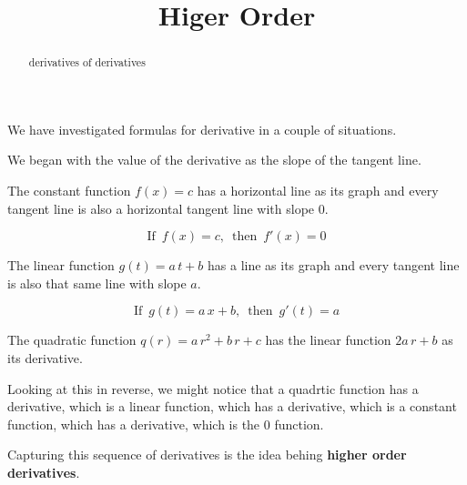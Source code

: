 \documentclass{ximera}
\title{Higer Order}
\begin{document}
\begin{abstract}
  derivatives of derivatives
\end{abstract}
\maketitle





We have investigated formulas for derivative in a couple of situations.


We began with the value of the derivative as the slope of the tangent line.

The constant function $f(x) = c$ has a horizontal line as its graph and every tangent line is also a horizontal tangent line with slope $0$.


\[
\text{If } \, f(x) = c, \, \text{ then } \, f'(x) = 0
\]



The linear function $g(t) = a \, t + b$ has a line as its graph and every tangent line is also that same line with slope $a$.



\[
\text{If } \, g(t) = a \, x + b, \, \text{ then } \, g'(t) = a
\]




The quadratic function $q(r) = a \, r^2 + b \, r + c$ has the linear function $2a \, r + b$ as its derivative.





Looking at this in reverse, we might notice that a quadrtic function has a derivative, which is a linear function, which has a derivative, which is a constant function, which has a derivative, which is the $0$ function.



Capturing this sequence of derivatives is the idea behing \textbf{higher order derivatives}.
\end{document}
